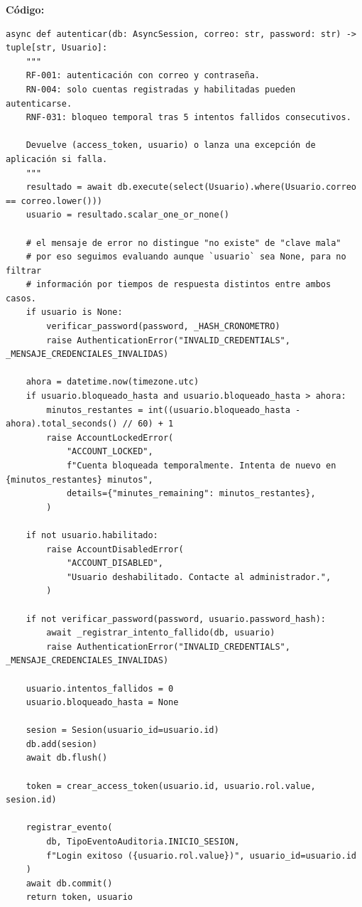 \documentclass[11pt,a4paper]{article}
\begin{document}
\textbf{Código:}
\begin{lstlisting}
async def autenticar(db: AsyncSession, correo: str, password: str) -> tuple[str, Usuario]:
    """
    RF-001: autenticación con correo y contraseña.
    RN-004: solo cuentas registradas y habilitadas pueden autenticarse.
    RNF-031: bloqueo temporal tras 5 intentos fallidos consecutivos.

    Devuelve (access_token, usuario) o lanza una excepción de aplicación si falla.
    """
    resultado = await db.execute(select(Usuario).where(Usuario.correo == correo.lower()))
    usuario = resultado.scalar_one_or_none()

    # el mensaje de error no distingue "no existe" de "clave mala"
    # por eso seguimos evaluando aunque `usuario` sea None, para no filtrar
    # información por tiempos de respuesta distintos entre ambos casos.
    if usuario is None:
        verificar_password(password, _HASH_CRONOMETRO)
        raise AuthenticationError("INVALID_CREDENTIALS", _MENSAJE_CREDENCIALES_INVALIDAS)

    ahora = datetime.now(timezone.utc)
    if usuario.bloqueado_hasta and usuario.bloqueado_hasta > ahora:
        minutos_restantes = int((usuario.bloqueado_hasta - ahora).total_seconds() // 60) + 1
        raise AccountLockedError(
            "ACCOUNT_LOCKED",
            f"Cuenta bloqueada temporalmente. Intenta de nuevo en {minutos_restantes} minutos",
            details={"minutes_remaining": minutos_restantes},
        )

    if not usuario.habilitado:
        raise AccountDisabledError(
            "ACCOUNT_DISABLED",
            "Usuario deshabilitado. Contacte al administrador.",
        )

    if not verificar_password(password, usuario.password_hash):
        await _registrar_intento_fallido(db, usuario)
        raise AuthenticationError("INVALID_CREDENTIALS", _MENSAJE_CREDENCIALES_INVALIDAS)

    usuario.intentos_fallidos = 0
    usuario.bloqueado_hasta = None

    sesion = Sesion(usuario_id=usuario.id)
    db.add(sesion)
    await db.flush()

    token = crear_access_token(usuario.id, usuario.rol.value, sesion.id)

    registrar_evento(
        db, TipoEventoAuditoria.INICIO_SESION,
        f"Login exitoso ({usuario.rol.value})", usuario_id=usuario.id
    )
    await db.commit()
    return token, usuario
\end{lstlisting}
\end{document}
